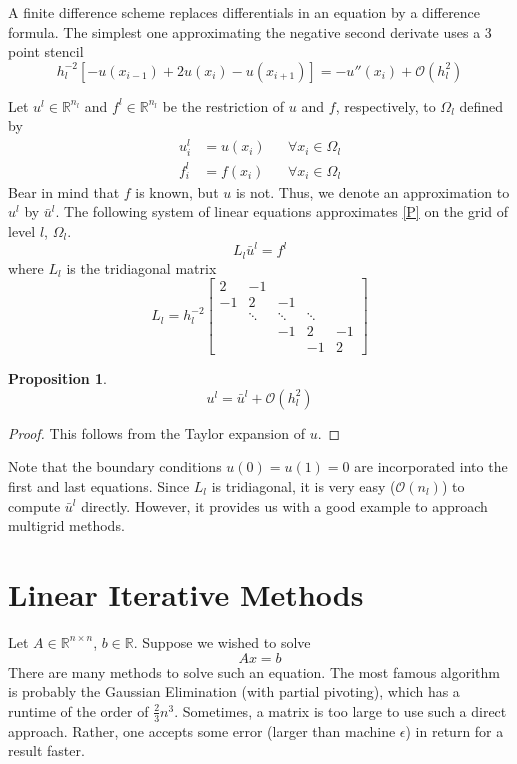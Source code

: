 \documentclass[a4paper,10pt,oneside]{book}
\theoremstyle{plain}%
\newtheorem{prop}[thm]{Proposition}
\theoremstyle{definition}
\theoremstyle{remark}
\newcommand{\bbR}{\mathbb{R}}
\newcommand{\calO}{\mathcal{O}}
\newcommand{\hl}{h_l} %
\newcommand{\Omegal}{\Omega_l} %
\newcommand{\nl}{n_l} %
\newcommand{\fl}{f^l}
\newcommand{\ul}{u^l}
\newcommand{\bul}{\bar{u}^l}
\newcommand{\Ll}{L_l}
\begin{document}
A finite difference scheme replaces differentials in an equation by a difference
formula. The simplest one approximating the negative second derivate uses a 3
point stencil
\begin{equation}
 \hl^{-2}\left[-u(x_{i-1})+2u(x_i)-u(x_{i+1})\right]=-u''(x_i)+\mathcal{O}
(\hl^2)
\end{equation}

Let $\ul\in\bbR^{\nl}$ and $\fl\in\bbR^{\nl}$ be the restriction of $u$ and $f$,
respectively, to $\Omegal$ defined by
\begin{align}
 \ul_i&=u(x_i)&&\forall x_i\in\Omegal\\
 \fl_i&=f(x_i)&&\forall x_i\in\Omegal
\end{align}
Bear in mind that $f$ is known, but $u$ is not. Thus, we denote an approximation
to $\ul$ by $\bul$. The following system of linear equations approximates
\eqref{P} on the grid of level $l$, $\Omegal$.
\begin{equation}
 \Ll\bul=\fl\label{PA}
\end{equation}
where $\Ll$ is the tridiagonal matrix
\begin{equation}
 \Ll=\hl^{-2}
  \begin{bmatrix}
   2&-1&&&\\
   -1 & 2 & -1&&\\
   & \ddots & \ddots & \ddots&\\
   && -1 & 2 & -1 \\
   &&& -1 & 2
  \end{bmatrix}
\end{equation}

\begin{prop}
 \begin{equation}
  \ul = \bul + \calO(\hl^2)
 \end{equation}
\end{prop}
\begin{proof}
 This follows from the Taylor expansion of $u$.
\end{proof}

Note that the boundary conditions $u(0)=u(1)=0$ are incorporated into the first
and last equations. Since $\Ll$ is tridiagonal, it is very easy ($\calO(\nl)$)
to compute $\bul$ directly. However, it provides us with a good example to
approach multigrid methods.

\section{Linear Iterative Methods}
Let $A\in\bbR^{n\times n}$, $b\in\bbR$. Suppose we wished to solve
\begin{equation}
 Ax=b\label{SLE}
\end{equation}
There are many methods to solve such an equation. The most famous algorithm is
probably the Gaussian Elimination (with partial pivoting), which has a runtime
of the order of $\frac{2}{3}n^3$. Sometimes, a matrix is too large to use such a
direct approach. Rather, one accepts some error (larger than machine $\epsilon$)
in return for a result faster.
\end{document}
